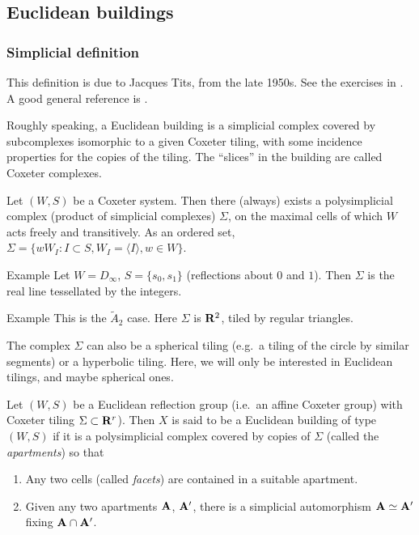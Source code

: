 \subsection{Euclidean buildings}


\subsubsection{Simplicial definition}

This definition is due to Jacques Tits, from the late 1950s. See the exercises 
in \cite[IV]{b02}. A good general reference is \cite{ab08}. 

Roughly speaking, a Euclidean building is a simplicial complex covered by 
subcomplexes isomorphic to a given Coxeter tiling, with some incidence 
properties for the copies of the tiling. The ``slices'' in the building are 
called Coxeter complexes. 

Let $(W,S)$ be a Coxeter system. Then there (always) exists a polysimplicial 
complex (product of simplicial complexes) $\Sigma$, on the maximal 
cells of which $W$ acts freely and transitively. As an ordered set, 
$\Sigma=\{w W_I:I\subset S,W_I=\langle I\rangle, w\in W\}$. 

\begin{enonce}{Example}
Let $W=D_\infty$, $S=\{s_0,s_1\}$ (reflections about $0$ and $1$). Then 
$\Sigma$ is the real line tessellated by the integers. 
\end{enonce}

\begin{enonce}{Example}
This is the $\widetilde A_2$ case. Here $\Sigma$ is $\mathbf{R}^2$, tiled by regular 
triangles. 
\end{enonce}

The complex $\Sigma$ can also be a spherical tiling (e.g.\ a tiling of the 
circle by similar segments) or a hyperbolic tiling. Here, we will only be 
interested in Euclidean tilings, and maybe spherical ones. 

\begin{defi}
Let $(W,S)$ be a Euclidean reflection group (i.e.\ an affine Coxeter group) with 
Coxeter tiling $\Sigma\subset \mathbf{R}^r$). Then $X$ is said to be a Euclidean 
building of type $(W,S)$ if it is a polysimplicial complex covered by copies of 
$\Sigma$ (called the \emph{apartments}) so that 
\begin{enumerate}
  \item Any two cells (called \emph{facets}) are contained in a suitable apartment. 
  \item Given any two apartments $\mathbf{A}$, $\mathbf{A}'$, there is a simplicial 
    automorphism $\mathbf{A}\simeq \mathbf{A}'$ fixing $\mathbf{A}\cap \mathbf{A}'$. 
\end{enumerate}
\end{defi}

